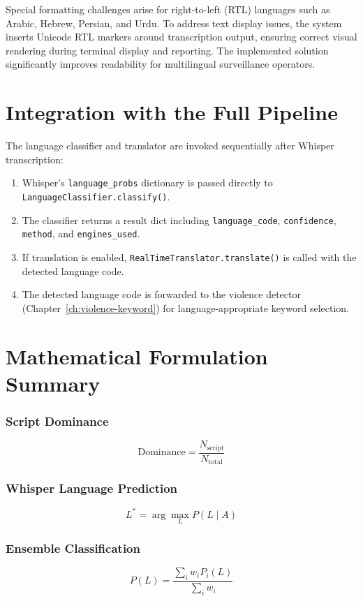 \documentclass[12pt]{report}
\begin{document}
Special formatting challenges arise for right-to-left (RTL) languages such as Arabic, Hebrew, Persian, and Urdu. To address text display issues, the system inserts Unicode RTL markers around transcription output, ensuring correct visual rendering during terminal display and reporting. The implemented solution significantly improves readability for multilingual surveillance operators.

\section{Integration with the Full Pipeline}

The language classifier and translator are invoked sequentially after Whisper transcription:
\begin{enumerate}
    \item Whisper's \texttt{language\_probs} dictionary is passed directly to \texttt{LanguageClassifier.classify()}.
    \item The classifier returns a result dict including \texttt{language\_code}, \texttt{confidence}, \texttt{method}, and \texttt{engines\_used}.
    \item If translation is enabled, \texttt{RealTimeTranslator.translate()} is called with the detected language code.
    \item The detected language code is forwarded to the violence detector (Chapter~\ref{ch:violence-keyword}) for language-appropriate keyword selection.
\end{enumerate}

\section{Mathematical Formulation Summary}

\subsubsection{Script Dominance}
\[
\text{Dominance} = \frac{N_{\text{script}}}{N_{\text{total}}}
\]

\subsubsection{Whisper Language Prediction}
\[
L^* = \arg\max_L P(L \mid A)
\]

\subsubsection{Ensemble Classification}
\[
P(L) = \frac{\sum_i w_i P_i(L)}{\sum_i w_i}
\]
\end{document}
